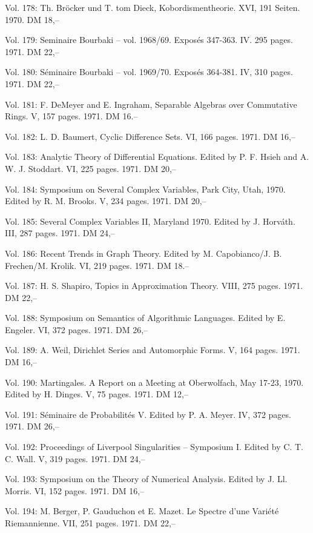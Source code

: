 Vol. 178: Th. Bröcker und T. tom Dieck, Kobordismentheorie. XVI, 191 Seiten. 1970. DM 18,--

Vol. 179: Seminaire Bourbaki -- vol. 1968/69. Exposés 347-363. IV. 295 pages. 1971. DM 22,--

Vol. 180: Séminaire Bourbaki -- vol. 1969/70. Exposés 364-381. IV, 310 pages. 1971. DM 22,--

Vol. 181: F. DeMeyer and E. Ingraham, Separable Algebras over Commutative Rings. V, 157 pages. 1971. DM 16.--

%
Vol. 182: L. D. Baumert, Cyclic Difference Sets. VI, 166 pages. 1971. DM 16,--

Vol. 183: Analytic Theory of Differential Equations. Edited by P. F. Hsieh and A. W. J. Stoddart. VI, 225 pages. 1971. DM 20,--

Vol. 184: Symposium on Several Complex Variables, Park City, Utah, 1970. Edited by R. M. Brooks. V, 234 pages. 1971. DM 20,--

Vol. 185: Several Complex Variables II, Maryland 1970. Edited by J. Horváth. III, 287 pages. 1971. DM 24,--

Vol. 186: Recent Trends in Graph Theory. Edited by M. Capobianco/J. B. Frechen/M. Krolik. VI, 219 pages. 1971. DM 18.--

Vol. 187: H. S. Shapiro, Topics in Approximation Theory. VIII, 275 pages. 1971. DM 22,--

Vol. 188: Symposium on Semantics of Algorithmic Languages. Edited by E. Engeler. VI, 372 pages. 1971. DM 26,--

Vol. 189: A. Weil, Dirichlet Series and Automorphic Forms. V, 164 pages. 1971. DM 16,--

Vol. 190: Martingales. A Report on a Meeting at Oberwolfach, May 17-23, 1970. Edited by H. Dinges. V, 75 pages. 1971. DM 12,--

Vol. 191: Séminaire de Probabilités V. Edited by P. A. Meyer. IV, 372 pages. 1971. DM 26,--

Vol. 192: Proceedings of Liverpool Singularities -- Symposium I. Edited by C. T. C. Wall. V, 319 pages. 1971. DM 24,--

Vol. 193: Symposium on the Theory of Numerical Analysis. Edited by J. Ll. Morris. VI, 152 pages. 1971. DM 16,--

Vol. 194: M. Berger, P. Gauduchon et E. Mazet. Le Spectre d'une Variété Riemannienne. VII, 251 pages. 1971. DM 22,--

